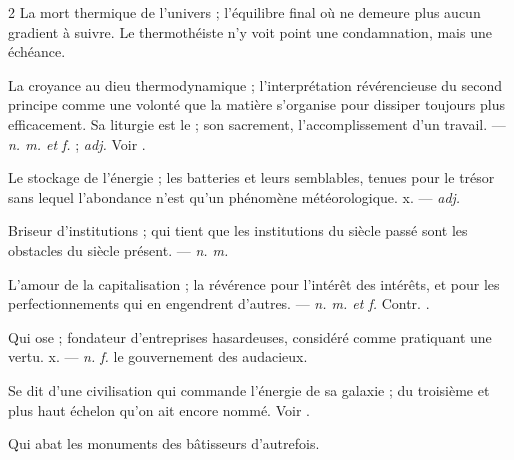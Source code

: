 \begin{multicols}{2}
 La mort thermique de l'univers ; l'équilibre final où ne demeure plus aucun gradient à suivre. Le thermothéiste n'y voit point une condamnation, mais une échéance. 

 La croyance au dieu thermodynamique ; l'interprétation révérencieuse du second principe comme une volonté que la matière s'organise pour dissiper toujours plus efficacement. Sa liturgie est le  ; son sacrement, l'accomplissement d'un travail. —  \textit{n. m. et f.} ;  \textit{adj.} Voir .

 Le stockage de l'énergie ; les batteries et leurs semblables, tenues pour le trésor sans lequel l'abondance n'est qu'un phénomène météorologique.   x. —  \textit{adj.}

 Briseur d'institutions ; qui tient que les institutions du siècle passé sont les obstacles du siècle présent. —  \textit{n. m.}

 L'amour de la capitalisation ; la révérence pour l'intérêt des intérêts, et pour les perfectionnements qui en engendrent d'autres. —  \textit{n. m. et f.} Contr. .

 Qui ose ; fondateur d'entreprises hasardeuses, considéré comme pratiquant une vertu.   x. —  \textit{n. f.} le gouvernement des audacieux.

 Se dit d'une civilisation qui commande l'énergie de sa galaxie ; du troisième et plus haut échelon qu'on ait encore nommé. Voir .

 Qui abat les monuments des bâtisseurs d'autrefois.


\end{multicols}
